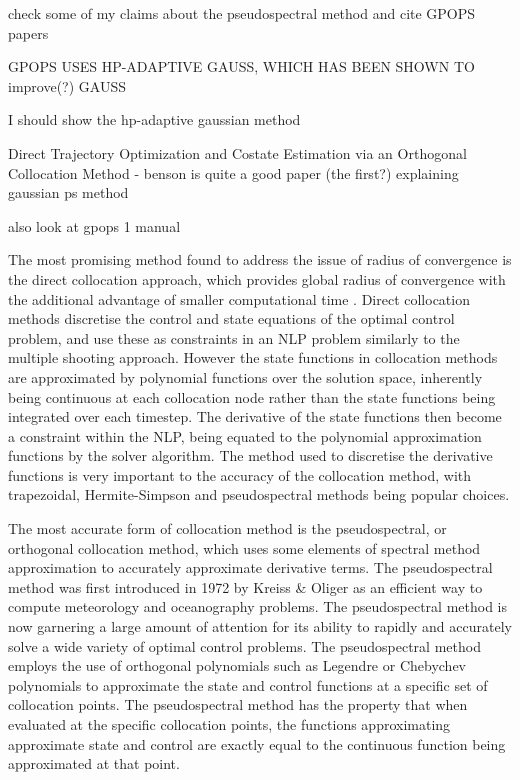 check some of my claims about the pseudospectral method and cite GPOPS papers

GPOPS USES HP-ADAPTIVE GAUSS, WHICH HAS BEEN SHOWN TO improve(?) GAUSS

I should show the hp-adaptive gaussian method

Direct Trajectory Optimization and
Costate Estimation via an Orthogonal
Collocation Method - benson
is quite a good paper (the first?) explaining gaussian ps method

also look at gpops 1 manual

The most promising method found to address the issue of radius of convergence is the direct collocation approach, which provides global radius of convergence with the additional advantage of smaller computational time \cite{Fasano2013}. Direct collocation methods discretise the control and state equations of the optimal control problem, and use these as constraints in an NLP problem similarly to the multiple shooting approach. However the state functions in collocation methods are approximated by polynomial functions over the solution space, inherently being continuous at each collocation node rather than the state functions being integrated over each timestep. The derivative of the state functions then become a constraint within the NLP, being equated to the polynomial approximation functions by the solver algorithm. The method used to discretise the derivative functions is very important to the accuracy of the collocation method, with trapezoidal, Hermite-Simpson and pseudospectral methods being popular choices.


The most accurate form of collocation method is the pseudospectral, or orthogonal collocation method\cite{Fahroo2000}, which uses some elements of spectral method approximation to accurately approximate derivative terms. The pseudospectral method was first introduced in 1972 by Kreiss \& Oliger \cite{Kreiss1972} as an efficient way to compute meteorology and oceanography problems. The pseudospectral method is now garnering a large amount of attention for its ability to rapidly and accurately solve a wide variety of optimal control problems. The pseudospectral method employs the use of orthogonal polynomials such as Legendre or Chebychev polynomials to approximate the state and control functions at a specific set of collocation points\cite{Fahroo2000,Huntington2007}. The pseudospectral method has the property that when evaluated at the specific collocation points, the functions approximating approximate state and control are exactly equal to the continuous function being approximated at that point. 

